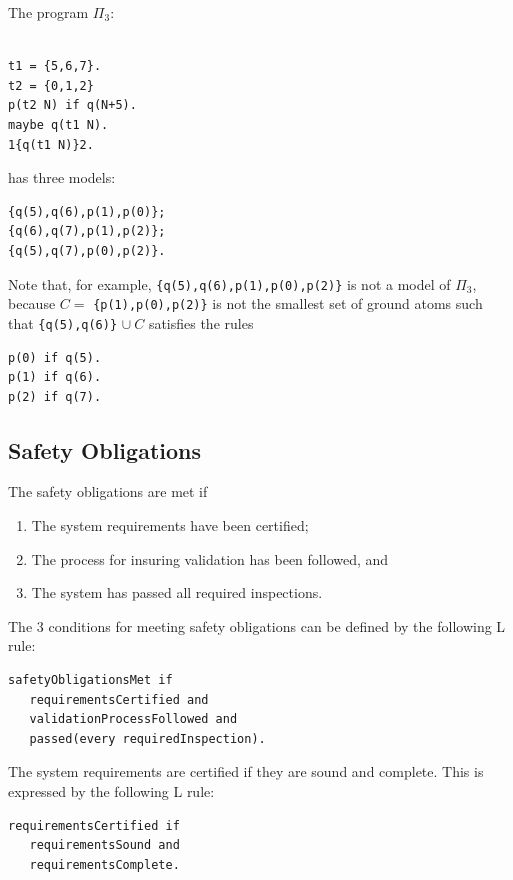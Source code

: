 \documentclass[a4paper,10pt]{article}
\begin{document}
\medskip\noindent
The program $\Pi_3$:
\begin{verbatim}

t1 = {5,6,7}.
t2 = {0,1,2}
p(t2 N) if q(N+5).
maybe q(t1 N).
1{q(t1 N)}2. 
\end{verbatim}
has three models:
\begin{verbatim}
{q(5),q(6),p(1),p(0)}; 
{q(6),q(7),p(1),p(2)}; 
{q(5),q(7),p(0),p(2)}.
\end{verbatim}

\medskip\noindent
Note that, for example, \texttt{\{q(5),q(6),p(1),p(0),p(2)\}} is not a model of $\Pi_3$, because $C =$ \texttt{\{p(1),p(0),p(2)\}} is not the smallest set of ground atoms such that \texttt{\{q(5),q(6)\}} $\cup~C$ satisfies the rules
\begin{verbatim}
p(0) if q(5).
p(1) if q(6).
p(2) if q(7).
\end{verbatim}
 

\subsection{Safety Obligations}

The safety obligations are met if
\begin{enumerate}
 \item The system requirements have been certified;
 \item The process for insuring validation has been followed, and
  \item The system has passed all required inspections.
\end{enumerate}

\medskip\noindent
The 3 conditions for meeting safety obligations can be defined by the following L rule:

\begin{verbatim}
safetyObligationsMet if
   requirementsCertified and
   validationProcessFollowed and
   passed(every requiredInspection).
\end{verbatim}



\medskip\noindent
The system requirements are certified if they are sound and complete. This is expressed by the following L rule:

\begin{verbatim}
requirementsCertified if
   requirementsSound and
   requirementsComplete.
\end{verbatim}
\end{document}

